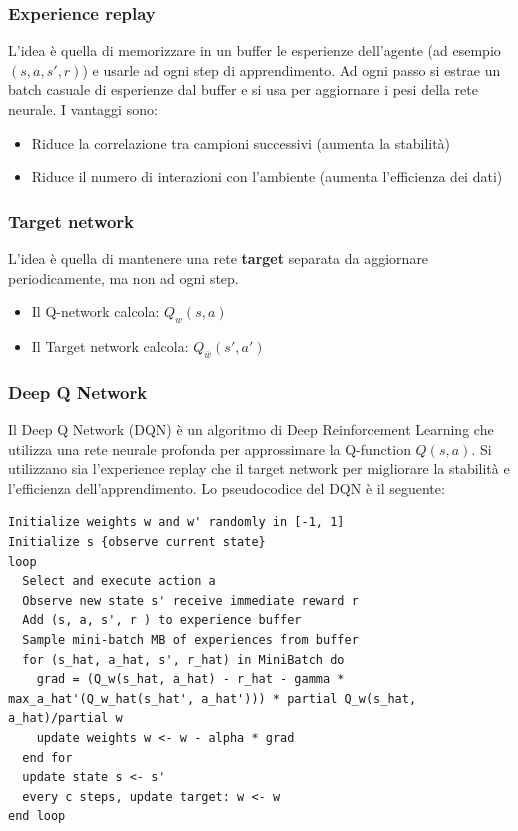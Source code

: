 \documentclass[a4paper]{article}
\begin{document}
\subsubsection{Experience replay}
L'idea è quella di memorizzare in un buffer le esperienze dell'agente (ad esempio \( (s, a, s', r) \))
e usarle ad ogni step di apprendimento. Ad ogni passo si estrae un batch casuale di esperienze
dal buffer e si usa per aggiornare i pesi della rete neurale. I vantaggi sono:

\begin{itemize}
  \item Riduce la correlazione tra campioni successivi (aumenta la stabilità)
  \item Riduce il numero di interazioni con l'ambiente (aumenta l'efficienza dei dati)
\end{itemize}

\subsubsection{Target network}
L'idea è quella di mantenere una rete \textbf{target} separata da aggiornare periodicamente,
ma non ad ogni step.

\begin{itemize}
  \item Il Q-network calcola: \( Q_w(s,a) \)
  \item Il Target network calcola: \( Q_{\overline{w}}(s', a') \)
\end{itemize}

\subsubsection{Deep Q Network}
Il Deep Q Network (DQN) è un algoritmo di Deep Reinforcement Learning che
utilizza una rete neurale profonda per approssimare la Q-function \( Q(s ,a) \).
Si utilizzano sia l'experience replay che il target network per migliorare
la stabilità e l'efficienza dell'apprendimento. Lo pseudocodice del DQN è il seguente:

\begin{lstlisting}
Initialize weights w and w' randomly in [-1, 1]
Initialize s {observe current state}
loop
  Select and execute action a
  Observe new state s' receive immediate reward r
  Add (s, a, s', r ) to experience buffer
  Sample mini-batch MB of experiences from buffer
  for (s_hat, a_hat, s', r_hat) in MiniBatch do
    grad = (Q_w(s_hat, a_hat) - r_hat - gamma * max_a_hat'(Q_w_hat(s_hat', a_hat'))) * partial Q_w(s_hat, a_hat)/partial w
    update weights w <- w - alpha * grad
  end for
  update state s <- s'
  every c steps, update target: w <- w
end loop
\end{lstlisting}
\end{document}
